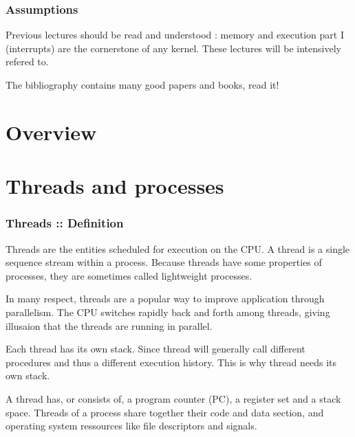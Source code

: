 
\begin{frame}
  \frametitle{Assumptions}

 Previous lectures should be read and understood : memory and execution part I (interrupts) are the cornerstone of any kernel. These lectures will be intensively refered to.

\-

The bibliography contains many good papers and books, read it!

\end{frame}



%
%

\section{Overview}

\section{Threads and processes}


\begin{frame}
  \frametitle{Threads :: Definition}

Threads are the entities scheduled for execution on the CPU. A thread is a single sequence stream within a process. Because threads have some properties of processes, they are sometimes called lightweight processes.

\-

In many respect, threads are a popular way to improve application through parallelism. The CPU switches rapidly back and forth among threads, giving illusaion that the threads are running in parallel.

\-

Each thread has its own stack. Since thread will generally call different procedures and thus a different execution history. This is why thread needs its own stack.

\-

A thread has, or consists of, a program counter (PC), a register set and a stack space. Threads of a process share together their code and data section, and operating system ressources like file descriptors and signals.

\end{frame}


